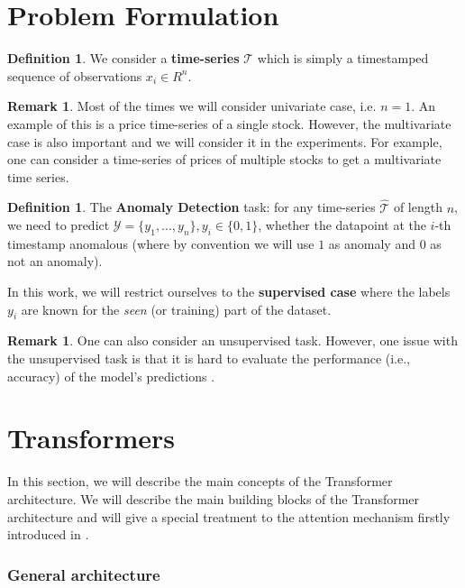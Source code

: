 \documentclass[a4paper, twoside]{report}
\theoremstyle{definition}
\newtheorem{definition}[theorem]{Definition}
\newtheorem{remark}[theorem]{Remark}
\numberwithin{equation}{section}
\begin{document}
\section{Problem Formulation}


\begin{definition}
    We consider a \textbf{time-series} $\mathcal{T}$ which is simply a timestamped sequence of observations $x_i \in R^n$.
\end{definition}
\begin{remark}
    Most of the times we will consider univariate case, i.e. $n=1$.
    An example of this is a price time-series of a single stock.
    However, the multivariate case is also important and we will consider it in the experiments.
    For example, one can consider a time-series of prices of multiple stocks to get a multivariate time series.
\end{remark}


\begin{definition}
    The \textbf{Anomaly Detection} task:
    for any time-series $\hat{\mathcal{T}}$ of length $n$, we need to predict $\mathcal{Y} = \{y_1, . . . , y_n \}, y_i \in \{0, 1\}$,
    whether the datapoint at the $i$-th timestamp anomalous (where by convention we will use $1$ as anomaly and $0$ as not an anomaly).
\end{definition}
In this work, we will restrict ourselves to the \textbf{supervised case}
where the labels $y_i$ are known for the \emph{seen} (or training) part of the dataset.

\begin{remark}
    One can also consider an unsupervised task.
    However, one issue with the unsupervised task is that it is hard to evaluate
    the performance (i.e., accuracy) of the model's predictions \cite{1905.05667}.
\end{remark}


\section{Transformers}

In this section, we will describe the main concepts of the Transformer architecture.
We will describe the main building blocks of the Transformer architecture
and will give a special treatment to the attention mechanism firstly introduced in \cite{1409.0473}.


\subsubsection{General architecture}
\end{document}
